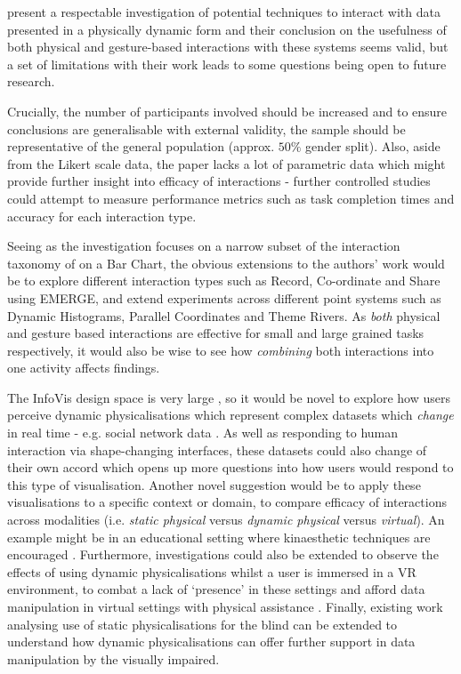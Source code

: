 \documentclass[11pt]{article}
\begin{document}
\citet{taher2015} present a respectable investigation of potential techniques to interact with data presented in a physically dynamic form and their conclusion on the usefulness of both physical and gesture-based interactions with these systems seems valid, but a set of limitations with their work leads to some questions being open to future research. 

Crucially, the number of participants involved should be increased and to ensure conclusions are generalisable with external validity, the sample should be representative of the general population (approx. $50\%$ gender split). Also, aside from the Likert scale data, the paper lacks a lot of parametric data which might provide further insight into efficacy of interactions - further controlled studies could attempt to measure performance metrics such as task completion times and accuracy for each interaction type.

Seeing as the investigation focuses on a narrow subset of the interaction taxonomy of \citet{heer2012} on a Bar Chart, the obvious extensions to the authors' work would be to explore different interaction types such as Record, Co-ordinate and Share using EMERGE, and extend experiments across different point systems such as Dynamic Histograms, Parallel Coordinates and Theme Rivers. As \textit{both} physical and gesture based interactions are effective for small and large grained tasks respectively, it would also be wise to see how \textit{combining} both interactions into one activity affects findings.

The InfoVis design space is very large \citep{card1997}, so it would be novel to explore how users perceive dynamic physicalisations which represent complex datasets which \textit{change} in real time - e.g. social network data \citep{federico2011}. As well as responding to human interaction via shape-changing interfaces, these datasets could also change of their own accord which opens up more questions into how users would respond to this type of visualisation. Another novel suggestion would be to apply these visualisations to a specific context or domain, to compare efficacy of interactions across modalities (i.e. \textit{static physical} versus \textit{dynamic physical} versus \textit{virtual}). An example might be in an educational setting where kinaesthetic techniques are encouraged \citep{gilakjani2011}. Furthermore, investigations could also be extended to observe the effects of using dynamic physicalisations whilst a user is immersed in a VR environment, to combat a lack of `presence' in these settings and afford data manipulation in virtual settings with physical assistance \citep{tennent2017}. Finally, existing work analysing use of static physicalisations for the blind \citep{perkins2002} can be extended to understand how dynamic physicalisations can offer further support in data manipulation by the visually impaired.
\end{document}
